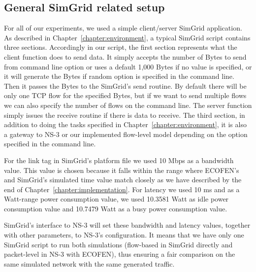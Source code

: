 \subsection{General SimGrid related setup}
For all of our experiments, we used a simple client/server SimGrid application. As described in Chapter~\ref{chapter:environment}, a typical SimGrid script contains three sections. Accordingly in our script, the first section represents what the client function does to send data. It simply accepts the number of Bytes to send from command line option or uses a default 1,000 Bytes if no value is specified, or it will generate the Bytes if random option is specified in the command line. Then it passes the Bytes to the SimGrid's send routine. By default there will be only one TCP flow for the specified Bytes, but if we want to send multiple flows we can also specify the number of flows on the command line. The server function simply issues the receive routine if there is data to receive. The third section, in addition to doing the tasks specified in Chapter~\ref{chapter:environment},  it is also a gateway to NS-3 or our implemented flow-level model depending on the option specified in the command line. 

For the link tag in SimGrid's platform file we used 10 Mbps  as a bandwidth value. This value is chosen because it falls within the range where ECOFEN's and SimGrid's simulated time value match closely as we have described by the end of Chapter~\ref{chapter:implementation}. For latency we used 10 ms and as a Watt-range power consumption value, we used 10.3581 Watt as idle power consumption value and 10.7479 Watt as a busy power consumption value. 

SimGrid's interface to NS-3 will set these bandwidth and latency values, together with other parameters, to NS-3's configuration. It means that we have only one SimGrid script to run both simulations (flow-based in SimGrid directly and packet-level in NS-3 with ECOFEN), thus ensuring a fair comparison on the same simulated network with the same generated traffic. 


